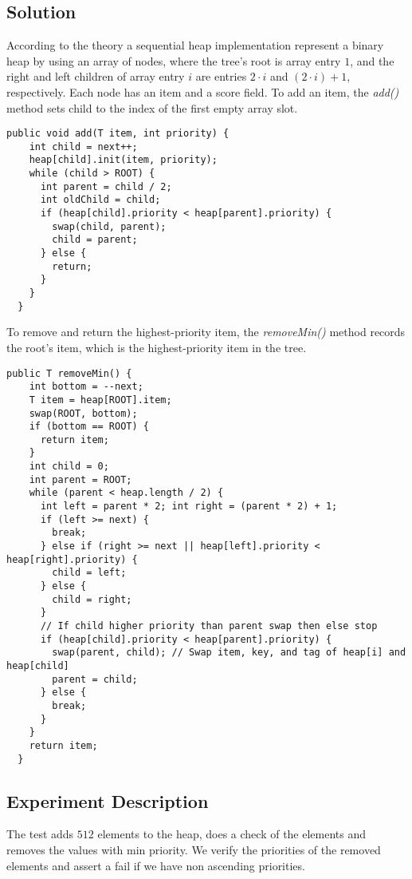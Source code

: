 \subsection{Solution}
\par
According to the theory a sequential heap implementation represent a binary heap by using an array of nodes, where the tree’s root is array entry $1$, and the right and left children of array entry $i$ are entries $2 · i$ and $(2 · i) + 1$, respectively.
Each node has an item and a score field. To add an item, the \textit{add()} method sets child to the index of the first empty array slot.
\par
\begin{lstlisting}[frame=single,breaklines=true]
  public void add(T item, int priority) {
    int child = next++;
    heap[child].init(item, priority);
    while (child > ROOT) {
      int parent = child / 2;
      int oldChild = child;
      if (heap[child].priority < heap[parent].priority) {
        swap(child, parent);
        child = parent;
      } else {
        return;
      }
    }
  }
\end{lstlisting}
\par
To remove and return the highest-priority item, the \textit{removeMin()} method records the root’s item, which is the highest-priority item in the tree.
\par
\begin{lstlisting}[frame=single,breaklines=true]
  public T removeMin() {
    int bottom = --next;
    T item = heap[ROOT].item;
    swap(ROOT, bottom);
    if (bottom == ROOT) {
      return item;
    }
    int child = 0;
    int parent = ROOT;
    while (parent < heap.length / 2) {
      int left = parent * 2; int right = (parent * 2) + 1;
      if (left >= next) {
        break;
      } else if (right >= next || heap[left].priority < heap[right].priority) {
        child = left;
      } else {
        child = right;
      }
      // If child higher priority than parent swap then else stop
      if (heap[child].priority < heap[parent].priority) {
        swap(parent, child); // Swap item, key, and tag of heap[i] and heap[child]
        parent = child;
      } else {
        break;
      }
    }
    return item;
  }
\end{lstlisting}


\subsection{Experiment Description} 
\par
The test adds $512$ elements to the heap, does a check of the elements and removes the values with min priority. We verify the priorities of the removed elements and assert a fail if we have non ascending priorities.
\par


